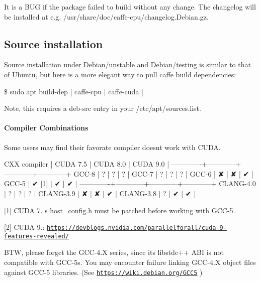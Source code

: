 It is a B\+UG if the package failed to build without any change. The changelog will be installed at e.\+g. {\ttfamily /usr/share/doc/caffe-\/cpu/changelog.Debian.\+gz}.

\subsection*{Source installation}

Source installation under Debian/unstable and Debian/testing is similar to that of Ubuntu, but here is a more elegant way to pull caffe build dependencies\+:


\begin{DoxyCode}
\$ sudo apt build-dep [ caffe-cpu | caffe-cuda ]
\end{DoxyCode}


Note, this requires a {\ttfamily deb-\/src} entry in your {\ttfamily /etc/apt/sources.list}.

\paragraph*{Compiler Combinations}

Some users may find their favorate compiler doesn\textquotesingle{}t work with C\+U\+DA.


\begin{DoxyCode}
CXX compiler |  CUDA 7.5  |  CUDA 8.0  |  CUDA 9.0  |
-------------+------------+------------+------------+
GCC-8        |     ?      |     ?      |     ?      |
GCC-7        |     ?      |     ?      |     ?      |
GCC-6        |     ✘      |     ✘      |     ✔      |
GCC-5        |     ✔ [1]  |     ✔      |     ✔      |
-------------+------------+------------+------------+
CLANG-4.0    |     ?      |     ?      |     ?      |
CLANG-3.9    |     ✘      |     ✘      |     ✔      |
CLANG-3.8    |     ?      |     ✔      |     ✔      |
\end{DoxyCode}


{\ttfamily \mbox{[}1\mbox{]}} C\+U\+DA 7. \textquotesingle{}s {\ttfamily host\+\_\+config.\+h} must be patched before working with G\+C\+C-\/5.

{\ttfamily \mbox{[}2\mbox{]}} C\+U\+DA 9.\+: \href{https://devblogs.nvidia.com/parallelforall/cuda-9-features-revealed/}{\tt https\+://devblogs.\+nvidia.\+com/parallelforall/cuda-\/9-\/features-\/revealed/}

B\+TW, please forget the G\+C\+C-\/4.\+X series, since its {\ttfamily libstdc++} A\+BI is not compatible with G\+C\+C-\/5\textquotesingle{}s. You may encounter failure linking G\+C\+C-\/4.\+X object files against G\+C\+C-\/5 libraries. (See \href{https://wiki.debian.org/GCC5}{\tt https\+://wiki.\+debian.\+org/\+G\+C\+C5} )

